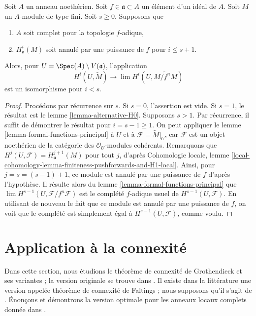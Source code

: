 \begin{lemma}
\label{lemma-alternative-higher}
Soit $A$ un anneau noethérien. Soit $f \in \mathfrak a \subset A$
un élément d'un idéal de $A$. Soit $M$ un $A$-module de type fini.
Soit $s \geq 0$. Supposons que
\begin{enumerate}
\item $A$ soit complet pour la topologie $f$-adique,
\item $H^i_\mathfrak a(M)$ soit annulé par une puissance de $f$
pour $i \leq s + 1$.
\end{enumerate}
Alors, pour $U = \Spec(A) \setminus V(\mathfrak a)$, l'application
$$
H^i(U, \widetilde{M})
\longrightarrow
\lim H^i(U, \widetilde{M/f^nM})
$$
est un isomorphisme pour $i < s$.
\end{lemma}

\begin{proof}
Procédons par récurrence sur $s$. Si $s = 0$, l'assertion est vide. Si $s = 1$, le
résultat est le lemme \ref{lemma-alternative-H0}. Supposons $s > 1$. Par récurrence,
il suffit de démontrer le résultat pour $i = s - 1 \geq 1$.
On peut appliquer le lemme \ref{lemma-formal-functions-principal}
à $U$ et à $\mathcal{F} = \widetilde{M}|_U$,
car $\mathcal{F}$ est un objet noethérien de
la catégorie des $\mathcal{O}_U$-modules cohérents.
Remarquons que $H^j(U, \mathcal{F}) = H^{j + 1}_\mathfrak a(M)$ pour tout $j$, d'après
Cohomologie locale, lemme
\ref{local-cohomology-lemma-finiteness-pushforwards-and-H1-local}.
Ainsi, pour $j = s = (s - 1) + 1$, ce module est
annulé par une puissance de $f$ d'après l'hypothèse.
Il résulte alors du
lemme \ref{lemma-formal-functions-principal} que
$\lim H^{s - 1}(U, \mathcal{F}/f^n\mathcal{F})$
est le complété $f$-adique usuel de $H^{s - 1}(U, \mathcal{F})$.
En utilisant de nouveau le fait que ce module est annulé par une puissance de
$f$, on voit que le complété est simplement égal à $H^{s - 1}(U, \mathcal{F})$,
comme voulu.
\end{proof}





\section{Application à la connexité}
\label{section-connected}

\noindent
Dans cette section, nous étudions le théorème de connexité de Grothendieck
et ses variantes ; la version originale se trouve dans
\cite[Exposee XIII, Theorem 2.1]{SGA2}. Il existe dans la littérature une version
appelée théorème de connexité de Faltings ;
nous supposons qu'il s'agit de \cite[Theorem 6]{Faltings-some}.
Énonçons et démontrons la version optimale pour les anneaux locaux
complets donnée dans \cite[Theorem 1.6]{Varbaro}.

